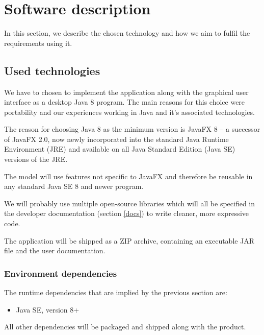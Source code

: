 \documentclass[10pt,a4paper,oneside]{article}
\newcommand{\TODO}[1]{{\textbf{TODO:} #1}} %
\begin{document}
%


\section{Software description}

In this section, we describe the chosen technology and how we aim to fulfil the requirements using it.

\subsection{Used technologies} \label{used-tech}

We have to chosen to implement the application along with the graphical user interface as a
desktop Java 8 program. The main reasons for this choice were portability and our experiences working in Java and it's associated technologies.

The reason for choosing Java 8 as the minimum version is JavaFX 8 -- a successor of JavaFX 2.0, now newly incorporated into
the standard Java Runtime Environment (JRE) and available on all Java Standard Edition (Java SE) versions of the JRE.

The model will use features not specific to JavaFX and therefore be reusable in any standard Java SE 8 and newer program.

We will probably use multiple open-source libraries which will all be specified in the developer documentation (section \ref{docs})
to write cleaner, more expressive code.

The application will be shipped as a ZIP archive, containing an executable JAR file and the user documentation.

\subsubsection{Environment dependencies}

The runtime dependencies that are implied by the previous section are:
\begin{itemize}
\item Java SE, version 8+
\end{itemize}
All other dependencies will be packaged and shipped along with the product.
\end{document}
